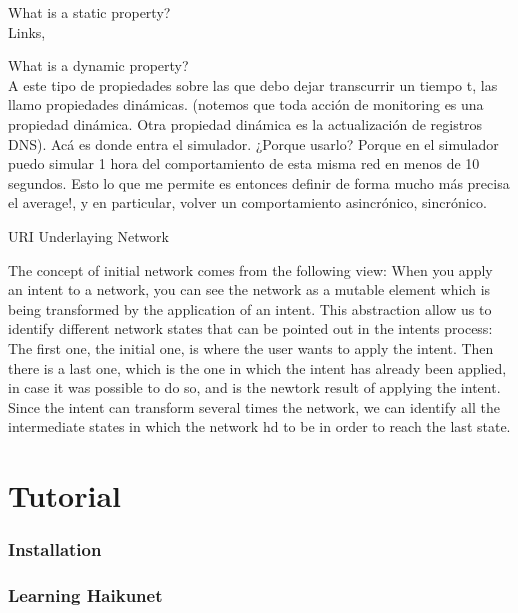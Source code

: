 What is a static property?\\

Links, 

What is a dynamic property?\\

A este tipo de propiedades sobre las que debo dejar transcurrir un tiempo t, las llamo propiedades dinámicas. (notemos que toda acción de monitoring es una propiedad dinámica. Otra propiedad dinámica es la actualización de registros DNS).
Acá es donde entra el simulador. ¿Porque usarlo? Porque en el simulador puedo simular 1 hora del comportamiento de esta misma red en menos de 10 segundos. Esto lo que me permite es entonces definir de forma mucho más precisa el average!, y en particular, volver un comportamiento asincrónico, sincrónico. 

URI Underlaying Network

The concept of initial network comes from the following view: When you apply an intent to a network, you can see the network as a mutable element which is being transformed by the application of an intent. This abstraction allow us to identify different network states that can be pointed out in the intents process: The first one, the initial one, is where the user wants to apply the intent. Then there is a last one, which is the one in which the intent has already been applied, in case it was possible to do so, and is the newtork result of applying the intent. Since the intent can transform several times the network, we can identify all the intermediate states in which the network hd to be in order to reach the last state. 

\section{Tutorial}

\subsubsection{Installation}

\subsubsection{Learning Haikunet}

